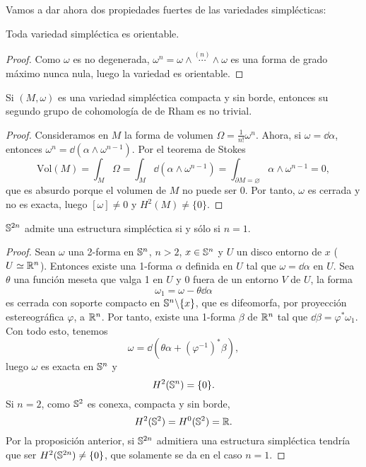 Vamos a dar ahora dos propiedades fuertes de las variedades simplécticas:
\begin{prop}
  Toda variedad simpléctica es orientable.
\end{prop}
\begin{proof}
  Como $\omega$ es no degenerada, $\omega^n=\omega \wedge \overset{(n)}{\cdots} \wedge \omega$ es una forma de grado máximo nunca nula, luego la variedad es orientable.
\end{proof}
\begin{prop}
  Si $(M,\omega)$ es una variedad simpléctica compacta y sin borde, entonces su segundo grupo de cohomología de de Rham es no trivial.
\end{prop}
\begin{proof}
  Consideramos en $M$ la forma de volumen $\Omega=\frac{1}{n!}\omega^n$. Ahora, si $\omega=\dd \alpha$, entonces $\omega^n=\dd (\alpha \wedge \omega^{n-1})$. Por el teorema de Stokes
  \begin{equation*}
    \text{Vol}(M)=\int_M \Omega=\int_M \dd (\alpha \wedge \omega^{n-1}) = \int_{\partial M=\varnothing} \alpha \wedge \omega^{n-1}=0,
  \end{equation*}
  que es absurdo porque el volumen de $M$ no puede ser 0. Por tanto, $\omega$ es cerrada y no es exacta, luego $[\omega]\neq 0$ y $H^2(M) \neq \{0\}$.
\end{proof}
\begin{corol}
  $\mathbb{S}^{2n}$ admite una estructura simpléctica si y sólo si $n=1$.
\end{corol}
\begin{proof}
  Sean $\omega$ una 2-forma en $\mathbb{S}^n$, $n>2$, $x\in \mathbb{S}^n$ y $U$ un disco entorno de $x$ ($U \simeq \mathbb{R}^n$). Entonces existe una 1-forma $\alpha$ definida en $U$ tal que $\omega=\dd \alpha$ en $U$. Sea $\theta$ una función meseta que valga 1 en $U$ y $0$ fuera de un entorno $V$ de $U$, la forma 
  \begin{equation*}
    \omega_1=\omega - \theta \dd \alpha
  \end{equation*}
  es cerrada con soporte compacto en $\mathbb{S}^n \backslash \{x\}$, que es difeomorfa, por proyección estereográfica $\varphi$, a $\mathbb{R}^n$. Por tanto, existe una 1-forma $\beta$ de $\mathbb{R}^n$ tal que $\dd \beta = \varphi^* \omega_1$. Con todo esto, tenemos
  \begin{equation*}
    \omega=\dd\left(\theta \alpha + \left( \varphi^{-1} \right)^* \beta \right) ,
  \end{equation*}
  luego $\omega$ es exacta en $\mathbb{S}^n$ y 
  \begin{equation*}
    H^2(\mathbb{S}^n)= \{0\}.
  \end{equation*}
  Si $n=2$, como $\mathbb{S}^2$ es conexa, compacta y sin borde,
  \begin{equation*}
    H^2(\mathbb{S}^2)=H^0(\mathbb{S}^2)=\mathbb{R}.   
  \end{equation*}
  Por la proposición anterior, si $\mathbb{S}^{2n}$ admitiera una estructura simpléctica tendría que ser $H^2(\mathbb{S}^{2n}) \neq \{0\}$, que solamente se da en el caso $n=1$.
\end{proof}

